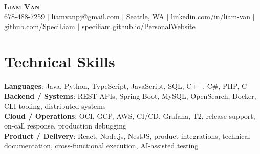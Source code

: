 \documentclass[letterpaper,11pt]{article}
\begin{document}

%
\begin{center}
    \textbf{\Huge \scshape Liam Van} \\ \vspace{1pt}
    \small 678-488-7259 $|$ \small {liamvanpj@gmail.com} $|$ Seattle, WA
 {{$|$ linkedin.com/in/liam-van} {$|$ github.com/SpeciLiam} {$|$ \href{https://speciliam.github.io/PersonalWebsite}{speciliam.github.io/PersonalWebsite}}}

\end{center}

\section{Technical Skills}
 \begin{itemize}[leftmargin=0.15in, label={}]
    \small{\item{
     \textbf{Languages}{: Java, Python, TypeScript, JavaScript, SQL, C++, C\#, PHP, C} \\
     \textbf{Backend / Systems}{: REST APIs, Spring Boot, MySQL, OpenSearch, Docker, CLI tooling, distributed systems} \\
     \textbf{Cloud / Operations}{: OCI, GCP, AWS, CI/CD, Grafana, T2, release support, on-call response, production debugging} \\
     \textbf{Product / Delivery}{: React, Node.js, NestJS, product integrations, technical documentation, cross-functional execution, AI-assisted testing} \\
    }}
 \end{itemize}
%
\end{document}

